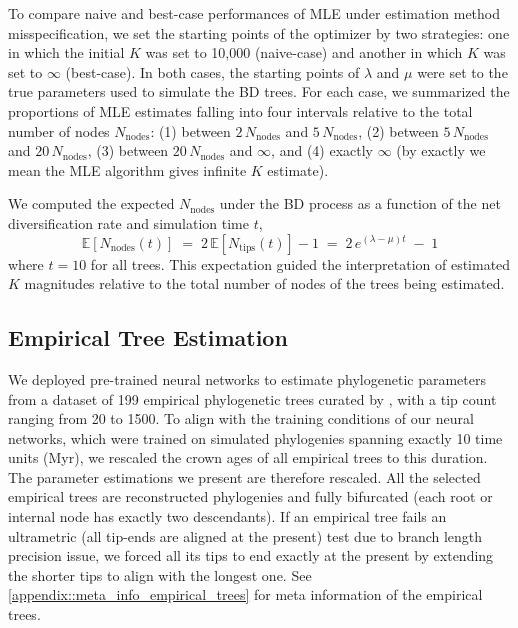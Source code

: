 {To compare naive and best-case performances of MLE under estimation method misspecification, we set the starting points of the optimizer by two strategies: one in which the initial $K$ was set to 10,000 (naive-case) and another in which $K$ was set to $\infty$ (best-case). In both cases, the starting points of $\lambda$ and $\mu$ were set to the true parameters used to simulate the BD trees. For each case, we summarized the proportions of MLE estimates falling into four intervals relative to the total number of nodes $N_{\mathrm{nodes}}$: (1) between $2\,N_{\mathrm{nodes}}$ and $5\,N_{\mathrm{nodes}}$, (2) between $5\,N_{\mathrm{nodes}}$ and $20\,N_{\mathrm{nodes}}$, (3) between $20\,N_{\mathrm{nodes}}$ and $\infty$, and (4) exactly $\infty$ (by exactly we mean the MLE algorithm gives infinite $K$ estimate).  

We computed the expected $N_{\mathrm{nodes}}$ under the BD process as a function of the net diversification rate and simulation time $t$,
\begin{equation}
\mathbb{E}[N_{\mathrm{nodes}}(t)]
\;=\;
2\,\mathbb{E}[N_{\mathrm{tips}}(t)] - 1
\;=\;
2\,e^{(\lambda-\mu)t} \;-\; 1
\end{equation}
where $t=10$ for all trees. This expectation guided the interpretation of estimated $K$ magnitudes relative to the total number of nodes of the trees being estimated.

\subsection{Empirical Tree Estimation}
\label{ch2::sec::methods::empirical}
We deployed pre-trained neural networks to estimate phylogenetic parameters from a dataset of 199 empirical phylogenetic trees curated by \citet{condamine_assessing_2019}, with a tip count ranging from 20 to 1500. To align with the training conditions of our neural networks, which were trained on simulated phylogenies spanning exactly 10 time units (Myr), we rescaled the crown ages of all empirical trees to this duration. The parameter estimations we present are therefore rescaled. All the selected empirical trees are reconstructed phylogenies and fully bifurcated (each root or internal node has exactly two descendants). If an empirical tree fails an ultrametric (all tip-ends are aligned at the present) test due to branch length precision issue, we forced all its tips to end exactly at the present by extending the shorter tips to align with the longest one. See \autoref{appendix::meta_info_empirical_trees} for meta information of the empirical trees. 

}
